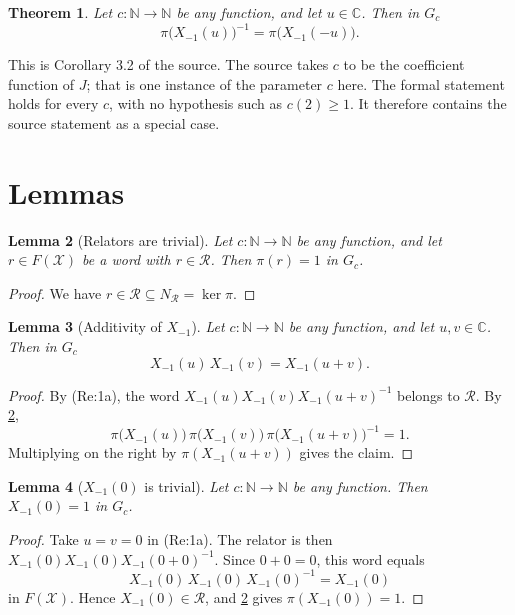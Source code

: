 \documentclass[11pt]{article}
\newtheorem{theorem}{Theorem}[section]
\newtheorem{lemma}[theorem]{Lemma}
\theoremstyle{definition}
\theoremstyle{remark}
\newcommand{\CC}{\mathbb{C}}
\newcommand{\NN}{\mathbb{N}}
\begin{document}
\begin{theorem}\label{thm:main}
Let $c\colon\NN\to\NN$ be any function, and let $u\in\CC$. Then in $G_c$
\[
\pi\big(X_{-1}(u)\big)^{-1}=\pi\big(X_{-1}(-u)\big).
\]
\end{theorem}

This is Corollary 3.2 of the source. The source takes $c$ to be the coefficient function of $J$; that is one instance of the parameter $c$ here. The formal statement holds for every $c$, with no hypothesis such as $c(2)\ge 1$. It therefore contains the source statement as a special case.

\section{Lemmas}

\begin{lemma}[Relators are trivial]\label{lem:mk_rel_eq_one_in_G}
Let $c\colon\NN\to\NN$ be any function, and let $r\in F(\mathcal{X})$ be a word with $r\in\mathcal{R}$. Then $\pi(r)=1$ in $G_c$.
\end{lemma}

\begin{proof}
We have $r\in\mathcal{R}\subseteq N_{\mathcal{R}}=\ker\pi$.
\end{proof}

\begin{lemma}[Additivity of $X_{-1}$]\label{lem:Xm_add_in_G}
Let $c\colon\NN\to\NN$ be any function, and let $u,v\in\CC$. Then in $G_c$
\[
X_{-1}(u)\,X_{-1}(v)=X_{-1}(u+v).
\]
\end{lemma}

\begin{proof}
By (Re:1a), the word $X_{-1}(u)X_{-1}(v)X_{-1}(u+v)^{-1}$ belongs to $\mathcal{R}$. By \cref{lem:mk_rel_eq_one_in_G},
\[
\pi\big(X_{-1}(u)\big)\,\pi\big(X_{-1}(v)\big)\,\pi\big(X_{-1}(u+v)\big)^{-1}=1.
\]
Multiplying on the right by $\pi(X_{-1}(u+v))$ gives the claim.
\end{proof}

\begin{lemma}[$X_{-1}(0)$ is trivial]\label{lem:Xm_zero_in_G}
Let $c\colon\NN\to\NN$ be any function. Then $X_{-1}(0)=1$ in $G_c$.
\end{lemma}

\begin{proof}
Take $u=v=0$ in (Re:1a). The relator is then $X_{-1}(0)X_{-1}(0)X_{-1}(0+0)^{-1}$. Since $0+0=0$, this word equals
\[
X_{-1}(0)\,X_{-1}(0)\,X_{-1}(0)^{-1}=X_{-1}(0)
\]
in $F(\mathcal{X})$. Hence $X_{-1}(0)\in\mathcal{R}$, and \cref{lem:mk_rel_eq_one_in_G} gives $\pi(X_{-1}(0))=1$.
\end{proof}
\end{document}
